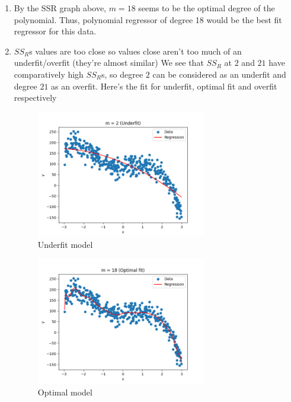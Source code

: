 \begin{enumerate}
	\item By the SSR graph above, $m=18$ seems to be the optimal degree of
	      the polynomial. Thus, polynomial regressor of degree 18 would be the
	      best fit regressor for this data.
	\item $SS_R$s values are too close so values close aren't too much of an
	      underfit/overfit (they're almost similar) We see that $SS_R$ at $2$
	      and $21$ have comparatively high $SS_R$s, so degree $2$ can be
	      considered as an underfit and degree $21$ as an overfit. Here's the
	      fit for underfit, optimal fit and overfit respectively
	      \begin{figure}
		      \centering
		      \includegraphics[width=0.7\textwidth]{../images/3/3_underfit.png}
		      \caption{Underfit model}
	      \end{figure}
	      \begin{figure}
		      \centering
		      \includegraphics[width=0.7\textwidth]{../images/3/3_correctfit.png}
		      \caption{Optimal model}
	      \end{figure}
	      \begin{figure}
		      \centering

\end{figure}
\end{enumerate}
